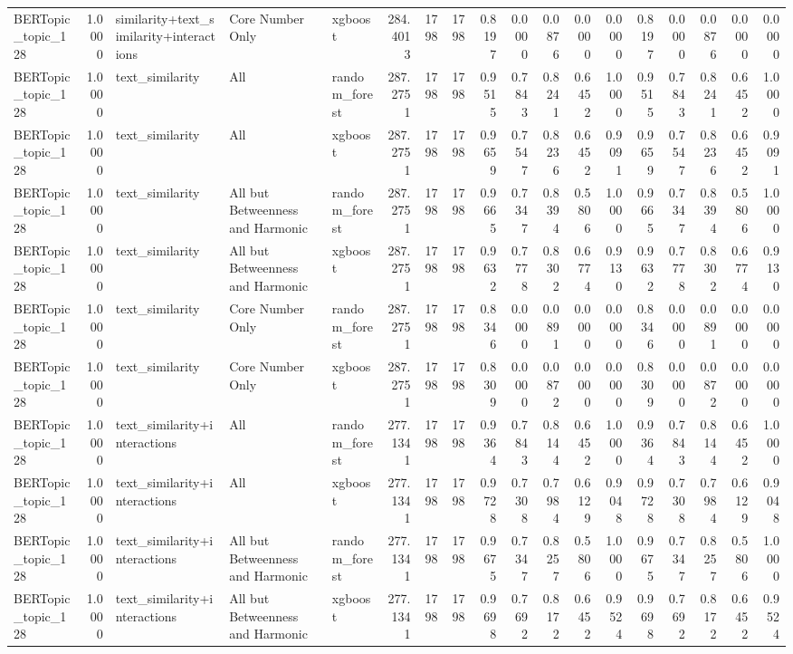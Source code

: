 \begin{tabular}{lrlllrrrrrrrrrrrrr}
BERTopic_topic_128 & 1.0000 & similarity+text_similarity+interactions & Core Number Only & xgboost & 284.4013 & 1798 & 1798 & 0.8197 & 0.0000 & 0.0876 & 0.0000 & 0.0000 & 0.8197 & 0.0000 & 0.0876 & 0.0000 & 0.0000 \\
BERTopic_topic_128 & 1.0000 & text_similarity & All & random_forest & 287.2751 & 1798 & 1798 & 0.9515 & 0.7843 & 0.8241 & 0.6452 & 1.0000 & 0.9515 & 0.7843 & 0.8241 & 0.6452 & 1.0000 \\
BERTopic_topic_128 & 1.0000 & text_similarity & All & xgboost & 287.2751 & 1798 & 1798 & 0.9659 & 0.7547 & 0.8236 & 0.6452 & 0.9091 & 0.9659 & 0.7547 & 0.8236 & 0.6452 & 0.9091 \\
BERTopic_topic_128 & 1.0000 & text_similarity & All but Betweenness and Harmonic & random_forest & 287.2751 & 1798 & 1798 & 0.9665 & 0.7347 & 0.8394 & 0.5806 & 1.0000 & 0.9665 & 0.7347 & 0.8394 & 0.5806 & 1.0000 \\
BERTopic_topic_128 & 1.0000 & text_similarity & All but Betweenness and Harmonic & xgboost & 287.2751 & 1798 & 1798 & 0.9632 & 0.7778 & 0.8302 & 0.6774 & 0.9130 & 0.9632 & 0.7778 & 0.8302 & 0.6774 & 0.9130 \\
BERTopic_topic_128 & 1.0000 & text_similarity & Core Number Only & random_forest & 287.2751 & 1798 & 1798 & 0.8346 & 0.0000 & 0.0891 & 0.0000 & 0.0000 & 0.8346 & 0.0000 & 0.0891 & 0.0000 & 0.0000 \\
BERTopic_topic_128 & 1.0000 & text_similarity & Core Number Only & xgboost & 287.2751 & 1798 & 1798 & 0.8309 & 0.0000 & 0.0872 & 0.0000 & 0.0000 & 0.8309 & 0.0000 & 0.0872 & 0.0000 & 0.0000 \\
BERTopic_topic_128 & 1.0000 & text_similarity+interactions & All & random_forest & 277.1341 & 1798 & 1798 & 0.9364 & 0.7843 & 0.8144 & 0.6452 & 1.0000 & 0.9364 & 0.7843 & 0.8144 & 0.6452 & 1.0000 \\
BERTopic_topic_128 & 1.0000 & text_similarity+interactions & All & xgboost & 277.1341 & 1798 & 1798 & 0.9728 & 0.7308 & 0.7984 & 0.6129 & 0.9048 & 0.9728 & 0.7308 & 0.7984 & 0.6129 & 0.9048 \\
BERTopic_topic_128 & 1.0000 & text_similarity+interactions & All but Betweenness and Harmonic & random_forest & 277.1341 & 1798 & 1798 & 0.9675 & 0.7347 & 0.8257 & 0.5806 & 1.0000 & 0.9675 & 0.7347 & 0.8257 & 0.5806 & 1.0000 \\
BERTopic_topic_128 & 1.0000 & text_similarity+interactions & All but Betweenness and Harmonic & xgboost & 277.1341 & 1798 & 1798 & 0.9698 & 0.7692 & 0.8172 & 0.6452 & 0.9524 & 0.9698 & 0.7692 & 0.8172 & 0.6452 & 0.9524 \\

\end{tabular}
